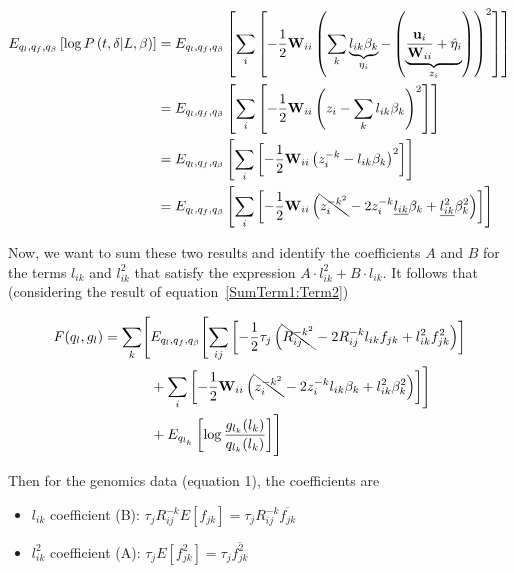 \documentclass{article}[12pt]
\begin{document}
\begin{align}
    E_{q_l, q_f, q_{\beta}}\left[\log P\left(t, \delta \vert L, \beta\right)\right] &= E_{q_l, q_f, q_{\beta}}\left[\sum_{i}\left[-\frac{1}{2}\mathbf{W}_{ii}\left(\sum_{k}\underbrace{l_{ik}\beta_{k}}_{\eta_i}-\left(\underbrace{\frac{\mathbf{u}_{i}}{\mathbf{W}_{ii}}+\hat{\eta}_{i}}_{z_i}\right)\right)^2\right]\right]\\
    &= E_{q_l, q_f, q_{\beta}}\left[\sum_{i}\left[-\frac{1}{2}\mathbf{W}_{ii}\left(z_{i} - \sum_{k}l_{ik}\beta_{k}\right)^2\right]\right]\\
    &= E_{q_l, q_f, q_{\beta}}\left[\sum_{i}\left[-\frac{1}{2}\mathbf{W}_{ii}\left(z_{i}^{-k}-l_{ik}\beta_{k}\right)^2\right]\right]\\
    &= E_{q_l, q_f, q_{\beta}}\left[\sum_{i}\left[-\frac{1}{2}\mathbf{W}_{ii}\left(\bcancel{z_{i}^{-k^2}}-2z_{i}^{-k}\underline{l_{ik}}\beta_{k}+\underline{l_{ik}^{2}}\beta_{k}^{2}\right)\right]\right]
\end{align}

Now, we want to sum these two results and identify the coefficients $A$ and $B$ for the terms $l_{ik}$ and $l_{ik}^2$ that satisfy the expression $A\cdot l_{ik}^{2} + B\cdot l_{ik}$. It follows that (considering the result of equation~\ref{SumTerm1:Term2})

\begin{equation}
\begin{aligned}
F(q_l, g_l) = \sum_{k} \Biggl[ & E_{q_l, q_f, q_{\beta}} \Biggl[ \sum_{ij} \left[ -\frac{1}{2}\tau_{j} \left( \bcancel{R_{ij}^{-k^2}} - 2R_{ij}^{-k} l_{ik} f_{jk} + l_{ik}^{2} f_{jk}^{2} \right) \right] \\
& + \sum_{i} \left[ -\frac{1}{2}\mathbf{W}_{ii} \left( \bcancel{z_{i}^{-k^2}} - 2z_{i}^{-k} l_{ik} \beta_{k} + l_{ik}^{2} \beta_{k}^{2} \right) \right] \Biggr] \\
& + E_{q_{l_k}} \left[ \log \frac{g_{l_k}(l_k)}{q_{l_k}(l_k)} \right] \Biggr]
\end{aligned}
\end{equation}

Then for the genomics data (equation 1), the coefficients are

\begin{itemize}
    \item $l_{ik}$ coefficient (B): $\tau_{j}R^{-k}_{ij}E\left[f_{jk}\right] = \tau_{j}R^{-k}_{ij}\overline{f_{jk}}$

    \item $l_{ik}^{2}$ coefficient (A): $\tau_{j}E\left[f^{2}_{jk}\right] = \tau_{j}\overline{f^{2}_{jk}}$
\end{itemize}
\end{document}
